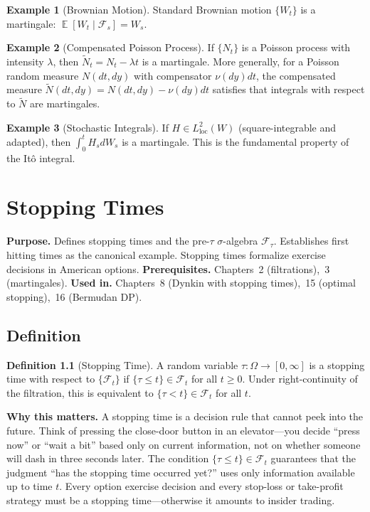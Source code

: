 \documentclass[11pt,a4paper,openany]{book}
\theoremstyle{definition}
\newtheorem{definition}{Definition}[chapter]
\newtheorem{example}[definition]{Example}
\theoremstyle{plain}
\theoremstyle{remark}
\DeclareMathOperator{\E}{\mathbb{E}}
\newcommand{\1}{\mathbbm{1}}
\newcommand{\F}{\mathcal{F}}
\begin{document}
\begin{example}[Brownian Motion]
Standard Brownian motion $\{W_{t}\}$ is a martingale: $\E[W_{t} \mid \F_{s}] = W_{s}$.
\end{example}

\begin{example}[Compensated Poisson Process]
If $\{N_{t}\}$ is a Poisson process with intensity $\lambda$, then $\widetilde{N}_{t} = N_{t} - \lambda t$ is a martingale. More generally, for a Poisson random measure $N(dt, dy)$ with compensator $\nu(dy) dt$, the compensated measure $\widetilde{N}(dt, dy) = N(dt, dy) - \nu(dy) dt$ satisfies that integrals with respect to $\widetilde{N}$ are martingales.
\end{example}

\begin{example}[Stochastic Integrals]
If $H \in L^{2}_{\text{loc}}(W)$ (square-integrable and adapted), then $\int_{0}^{t} H_{s} dW_{s}$ is a martingale. This is the fundamental property of the It\^{o} integral.
\end{example}

\chapter{Stopping Times}

\noindent\textbf{Purpose.} Defines stopping times and the pre-$\tau$ $\sigma$-algebra $\mathcal{F}_{\tau}$. Establishes first hitting times as the canonical example. Stopping times formalize exercise decisions in American options.
\textbf{Prerequisites.} Chapters~2 (filtrations),~3 (martingales).
\textbf{Used in.} Chapters~8 (Dynkin with stopping times),~15 (optimal stopping),~16 (Bermudan DP).

\section{Definition}

\begin{definition}[Stopping Time]
A random variable $\tau: \Omega \to [0, \infty]$ is a stopping time with respect to $\{\F_{t}\}$ if $\{\tau \leq t\} \in \F_{t}$ for all $t \geq 0$. Under right-continuity of the filtration, this is equivalent to $\{\tau < t\} \in \F_{t}$ for all $t$.
\end{definition}

\medskip
\noindent\textbf{Why this matters.} A stopping time is a decision rule that cannot peek into the future. Think of pressing the close-door button in an elevator---you decide ``press now'' or ``wait a bit'' based only on current information, not on whether someone will dash in three seconds later. The condition $\{\tau \leq t\} \in \mathcal{F}_t$ guarantees that the judgment ``has the stopping time occurred yet?'' uses only information available up to time $t$. Every option exercise decision and every stop-loss or take-profit strategy must be a stopping time---otherwise it amounts to insider trading.
\end{document}

